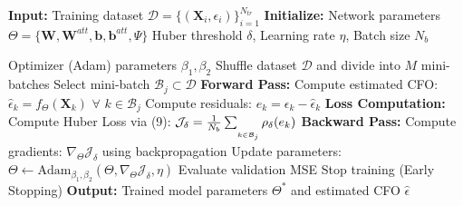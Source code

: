 \documentclass[10pt, journal]{IEEEtran}
\begin{document}
\begin{algorithm}
\caption{ Proposed CAD-HuberNet Architecture}
\begin{algorithmic}[1]
\State \textbf{Input:} Training dataset $\mathcal{D} = \{(\mathbf{X}_i, \epsilon_i)\}_{i=1}^{N_{tr}}$
\State \textbf{Initialize:} 
\State \quad Network parameters $\Theta = \{\mathbf{W}, \mathbf{W}^{att}, \mathbf{b}, \mathbf{b}^{att}, \Psi\}$
\State \quad Huber threshold $\delta$, Learning rate $\eta$, Batch size $N_b$

\State \quad Optimizer (Adam) parameters $\beta_1, \beta_2$
    \State Shuffle dataset $\mathcal{D}$ and divide into $M$ mini-batches
        \State Select mini-batch $\mathcal{B}_j \subset \mathcal{D}$
        \State \textbf{Forward Pass:}
        \State Compute estimated CFO: $\hat{\epsilon}_k = f_{\Theta}(\mathbf{X}_k)$ $\forall$ $k \in \mathcal{B}_j$
        \State Compute residuals: $e_k = \epsilon_k - \hat{\epsilon}_k$
        \State \textbf{Loss Computation:}
        \State Compute Huber Loss via (9): ${\footnotesize{\mathcal{J}_{\delta} = \frac{1}{N_b} \sum_{\underset{k \in \mathcal{B}_j}{}} \rho_{\delta}(e_k)}}$
        \State \textbf{Backward Pass:}
        \State Compute gradients: $\nabla_{\Theta} \mathcal{J}_{\delta}$ using backpropagation
        \State Update parameters: $\Theta \leftarrow \text{Adam}_{\beta_1, \beta_2}(\Theta, \nabla_{\Theta} \mathcal{J}_{\delta}, \eta)$
    \EndFor
    \State Evaluate validation MSE
        \State Stop training (Early Stopping)
    \EndIf
\EndFor
\State \textbf{Output:} Trained model parameters $\Theta^*$ and estimated CFO $\hat{\epsilon}$
\end{algorithmic}
\end{algorithm}




\end{document}
